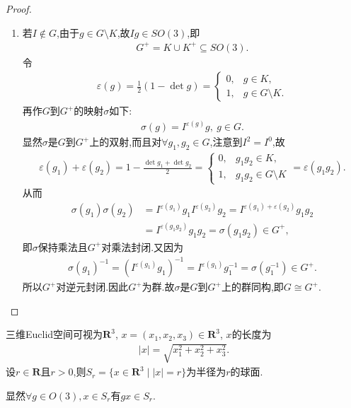 \documentclass[../../main.tex]{subfiles}%
\begin{document}
\begin{proof}
\begin{enumerate}[(1)]
\item 若$I \notin G$,由于$g \in G \setminus K$,故$Ig \in SO(3)$,即
\begin{align*}
G^+=K \cup K^+ \subseteq SO(3).
\end{align*}
令
\begin{align*}
\varepsilon(g)=\frac{1}{2}(1-\det g)=
\begin{cases}
0, & g \in K, \\
1, & g \in G \setminus K.
\end{cases}
\end{align*}
再作$G$到$G^+$的映射$\sigma$如下:
\begin{align*}
\sigma(g)=I^{\varepsilon(g)}g,\ g \in G.
\end{align*}
显然$\sigma$是$G$到$G^+$上的双射,而且对$\forall g_1,g_2\in G$,注意到$I^2=I^0$,故
\begin{align*}
\varepsilon(g_1)+\varepsilon(g_2) = 1-\frac{\det g_1+\det g_2}{2}=\begin{cases}
0, & g_1g_2 \in K, \\
1, & g_1g_2 \in G \setminus K
\end{cases}=\varepsilon(g_1g_2).
\end{align*}
从而
\begin{align*}
\sigma(g_1)\sigma(g_2)&=I^{\varepsilon(g_1)}g_1I^{\varepsilon(g_2)}g_2=I^{\varepsilon(g_1)+\varepsilon(g_2)}g_1g_2 \\
&=I^{\varepsilon(g_1g_2)}g_1g_2=\sigma(g_1g_2)\in G^+,
\end{align*}
即$\sigma$保持乘法且$G^+$对乘法封闭.又因为
\begin{align*}
\sigma \left( g_1 \right) ^{-1}=\left( I^{\varepsilon \left( g_1 \right)}g_1 \right) ^{-1}=I^{\varepsilon \left( g_1 \right)}g_{1}^{-1}=\sigma \left( g_{1}^{-1} \right) \in G^+.
\end{align*}
所以$G^+$对逆元封闭.因此$G^+$为群.故$\sigma$是$G$到$G^+$上的群同构,即$G \cong G^+$.
\end{enumerate}
\end{proof}

\begin{definition}
三维Euclid空间可视为$\mathbf{R}^3$, $x=(x_1,x_2,x_3) \in \mathbf{R}^3$, $x$的长度为
\begin{align*}
|x|=\sqrt{x_1^2+x_2^2+x_3^2}.
\end{align*}
设$r \in \mathbf{R}$且$r>0$,则$S_r=\{x \in \mathbf{R}^3\mid |x|=r\}$为半径为$r$的球面.
\end{definition}
\begin{remark}
显然$\forall g \in O(3), x \in S_r$有$gx \in S_r$.
\end{remark}
\end{document}

